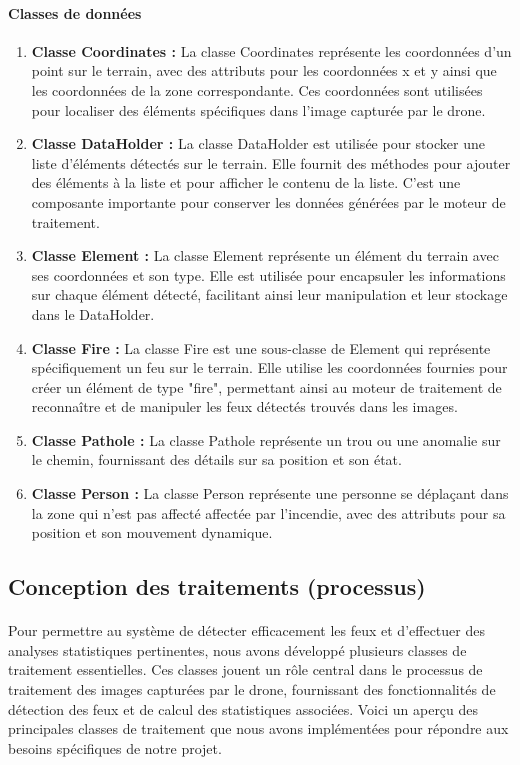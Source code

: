 \paragraph{Classes de données}
\begin{enumerate}
 \item \textbf{Classe Coordinates : }La classe Coordinates représente les
coordonnées d'un point sur le terrain, avec des attributs pour les
coordonnées x et y ainsi que les coordonnées de la zone correspondante.
Ces coordonnées sont utilisées pour localiser des éléments spécifiques
dans l'image capturée par le drone.
 \item \textbf{Classe DataHolder :} La classe DataHolder est utilisée pour stocker
une liste d'éléments détectés sur le terrain. Elle fournit des méthodes pour
ajouter des éléments à la liste et pour afficher le contenu de la liste. C'est
une composante importante pour conserver les données générées par le
moteur de traitement.
 \item  \textbf{Classe Element :} La classe Element représente un élément du terrain
avec ses coordonnées et son type. Elle est utilisée pour encapsuler les
informations sur chaque élément détecté, facilitant ainsi leur
manipulation et leur stockage dans le DataHolder.
 \item \textbf{Classe Fire :}  La classe Fire est une sous-classe de Element qui
représente spécifiquement un feu sur le terrain. Elle utilise les
coordonnées fournies pour créer un élément de type "fire", permettant
ainsi au moteur de traitement de reconnaître et de manipuler les feux
détectés trouvés dans les images.
\item \textbf{Classe Pathole :} La classe Pathole représente un trou ou une anomalie sur le chemin, fournissant des détails sur sa position et son état.
\item \textbf{Classe Person : }La classe Person représente une personne se déplaçant dans la zone qui n'est pas affecté affectée par l'incendie, avec des attributs pour sa position et son mouvement dynamique.
\end{enumerate}
\subsection{Conception des traitements (processus)}
\paragraph{}Pour permettre au système de détecter efficacement les feux et d’effectuer des analyses statistiques pertinentes, nous avons développé plusieurs classes de traitement essentielles. Ces classes jouent un rôle central dans le processus de traitement des images capturées par le drone, fournissant des fonctionnalités de détection des feux et de calcul des statistiques associées. Voici un aperçu des principales classes de traitement que nous avons implémentées pour répondre aux besoins spécifiques de notre projet.
